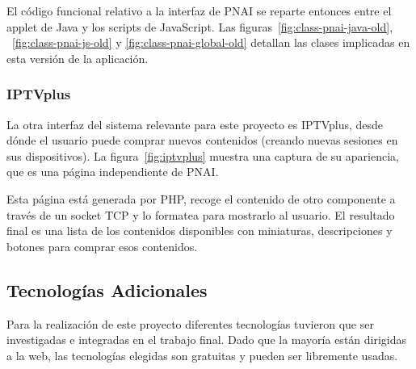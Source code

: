 El código funcional relativo a la interfaz de PNAI se reparte entonces entre el applet de Java y los scripts de JavaScript.
Las figuras~\ref{fig:class-pnai-java-old}, ~\ref{fig:class-pnai-js-old} y \ref{fig:class-pnai-global-old} detallan las clases implicadas en esta versión de la aplicación.

\subsubsection{IPTVplus} %
\label{ssub:iptvplus}

La otra interfaz del sistema relevante para este proyecto es IPTVplus, desde dónde el usuario puede comprar nuevos contenidos (creando nuevas sesiones en sus dispositivos).
La figura~\ref{fig:iptvplus} muestra una captura de su apariencia, que es una página independiente de PNAI.

Esta página está generada por PHP, recoge el contenido de otro componente a través de un socket TCP y lo formatea para mostrarlo al usuario.
El resultado final es una lista de los contenidos disponibles con miniaturas, descripciones y botones para comprar esos contenidos.

\subsection{Tecnologías Adicionales} %
\label{sub:tecnologias_adicionales}

Para la realización de este proyecto diferentes tecnologías tuvieron que ser investigadas e integradas en el trabajo final.
Dado que la mayoría están dirigidas a la web, las tecnologías elegidas son gratuitas y pueden ser libremente usadas.

